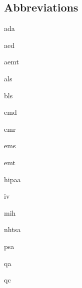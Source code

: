 \documentclass[../EMT-169.tex]{subfiles}
\begin{document}
\subsection*{Abbreviations}
\begin{description}[leftmargin=!,labelwidth=\widthof{\bfseries ABCDEF}]
	\item [\acrshort{ada}] 		\acrlong{ada}
	\item [\acrshort{aed}] 		\acrlong{aed}
	\item [\acrshort{aemt}] 	\acrlong{aemt}
	\item [\acrshort{als}] 		\acrlong{als}
	\item [\acrshort{bls}] 		\acrlong{bls}
	\item [\acrshort{emd}] 		\acrlong{emd}
	\item [\acrshort{emr}] 		\acrlong{emr}
	\item [\acrshort{ems}] 		\acrlong{ems}
	\item [\acrshort{emt}] 		\acrlong{emt}
	\item [\acrshort{hipaa}]	\acrlong{hipaa}
	\item [\acrshort{iv}] 		\acrlong{iv}
	\item [\acrshort{mih}] 		\acrlong{mih}
	\item [\acrshort{nhtsa}] 	\acrlong{nhtsa}
	\item [\acrshort{psa}] 		\acrlong{psa}
	\item [\acrshort{qa}] 		\acrlong{qa}
	\item [\acrshort{qc}] 		\acrlong{qc}
\end{description}
\end{document}
